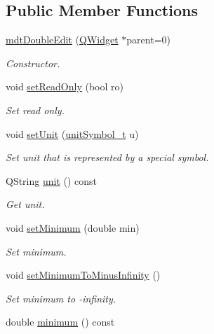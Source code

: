 \subsection*{Public Member Functions}
\begin{DoxyCompactItemize}
\item 
\hyperlink{classmdt_double_edit_a4b6a416aeb8594ad45fb706e79250ba7}{mdt\-Double\-Edit} (\hyperlink{class_q_widget}{Q\-Widget} $\ast$parent=0)
\begin{DoxyCompactList}\small\item\em Constructor. \end{DoxyCompactList}\item 
void \hyperlink{classmdt_double_edit_a5542c60073e80cfc5cc2f9f40167b460}{set\-Read\-Only} (bool ro)
\begin{DoxyCompactList}\small\item\em Set read only. \end{DoxyCompactList}\item 
void \hyperlink{classmdt_double_edit_a7574871fecfb0130e9d8947b55629cca}{set\-Unit} (\hyperlink{classmdt_double_edit_a6e94cba2a7b3fcc16b70475c2cefd8cf}{unit\-Symbol\-\_\-t} u)
\begin{DoxyCompactList}\small\item\em Set unit that is represented by a special symbol. \end{DoxyCompactList}\item 
Q\-String \hyperlink{classmdt_double_edit_ad425b7f96ae6906175c7a70fa3b8b017}{unit} () const 
\begin{DoxyCompactList}\small\item\em Get unit. \end{DoxyCompactList}\item 
void \hyperlink{classmdt_double_edit_abc719b2ad6c106759f4d138b7b221a75}{set\-Minimum} (double min)
\begin{DoxyCompactList}\small\item\em Set minimum. \end{DoxyCompactList}\item 
void \hyperlink{classmdt_double_edit_ae6dbdee92d4704a1e2185fb56653e913}{set\-Minimum\-To\-Minus\-Infinity} ()
\begin{DoxyCompactList}\small\item\em Set minimum to -\/infinity. \end{DoxyCompactList}\item 
double \hyperlink{classmdt_double_edit_a2e0974378639708551a703b5b1dc3969}{minimum} () const 

\end{DoxyCompactItemize}
